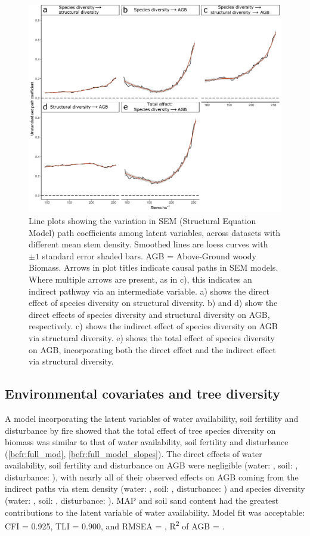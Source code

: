 \begin{refsection}
\begin{figure}
	\includegraphics[width=0.8\linewidth]{img/sem_struc_stems_ha}
	\caption[Effect of stems density on path coefficients]{Line plots showing the variation in SEM (Structural Equation Model) path coefficients among latent variables, across datasets with different mean stem density. Smoothed lines are loess curves with $\pm1$ standard error shaded bars. AGB = Above-Ground woody Biomass. Arrows in plot titles indicate causal paths in SEM models. Where multiple arrows are present, as in c), this indicates an indirect pathway via an intermediate variable. a) shows the direct effect of species diversity on structural diversity. b) and d) show the direct effects of species diversity and structural diversity on AGB, respectively. c) shows the indirect effect of species diversity on AGB via structural diversity. e) shows the total effect of species diversity on AGB, incorporating both the direct effect and the indirect effect via structural diversity.}
	\label{befr:sem_struc_stems_ha}
\end{figure}

\subsection{Environmental covariates and tree diversity}
\label{befr:ssec:env}

A model incorporating the latent variables of water availability, soil fertility and disturbance by fire showed that the total effect of tree species diversity on biomass was similar to that of water availability, soil fertility and disturbance (\autoref{befr:full_mod}, \autoref{befr:full_model_slopes}). The direct effects of water availability, soil fertility and disturbance on AGB were negligible (water: \fmbetamb{}, soil: \fmbetasb{}, disturbance: \fmbetafb{}), with nearly all of their observed effects on AGB coming from the indirect paths via stem density (water: \fmbetamib{}, soil: \fmbetasib{}, disturbance: \fmbetafib{}) and species diversity (water: \fmbetamd{}, soil: \fmbetasd{}, disturbance: \fmbetafd{}). MAP and soil sand content had the greatest contributions to the latent variable of water availability. Model fit was acceptable: CFI = 0.925, TLI = 0.900, and RMSEA = \fmrmsea{}, R\textsuperscript{2} of AGB = \fmrsq{}. 


\end{refsection}
